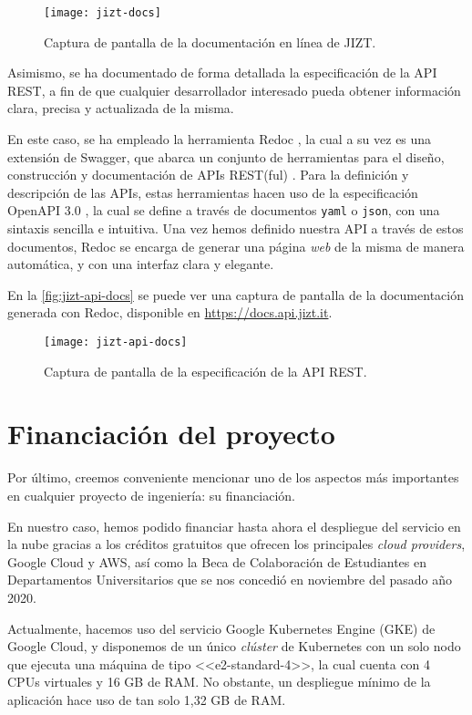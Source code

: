 \begin{figure}[h]
	\centering
	\texttt{[image: jizt-docs]}
	\caption{Captura de pantalla de la documentación en línea de JIZT.}
	\label{fig:jizt-docs}
\end{figure}

Asimismo, se ha documentado de forma detallada la especificación de la API REST, a fin de que cualquier desarrollador interesado pueda obtener información clara, precisa y actualizada de la misma.

En este caso, se ha empleado la herramienta Redoc \cite{redoc}, la cual a su vez es una extensión de Swagger, que abarca un conjunto de herramientas para el diseño, construcción y documentación de APIs REST(ful) \cite{swagger}. Para la definición y descripción de las APIs, estas herramientas hacen uso de la especificación OpenAPI 3.0 \cite{openapi}, la cual se define a través de documentos \texttt{yaml} o \texttt{json}, con una sintaxis sencilla e intuitiva. Una vez hemos definido nuestra API a través de estos documentos, Redoc se encarga de generar una página \emph{web} de la misma de manera automática, y con una interfaz clara y elegante.

En la \autoref{fig:jizt-api-docs} se puede ver una captura de pantalla de la documentación generada con Redoc, disponible en \href{https://docs.api.jizt.it}{https://docs.api.jizt.it}.

\newpage

\begin{figure}[h]
	\centering
	\texttt{[image: jizt-api-docs]}
	\caption{Captura de pantalla de la especificación de la API REST.}
	\label{fig:jizt-api-docs}
\end{figure}

\section{Financiación del proyecto}

Por último, creemos conveniente mencionar uno de los aspectos más importantes en cualquier proyecto de ingeniería: su financiación.

En nuestro caso, hemos podido financiar hasta ahora el despliegue del servicio en la nube gracias a los créditos gratuitos que ofrecen los principales \emph{cloud providers}, Google Cloud y AWS, así como la Beca de Colaboración de Estudiantes en Departamentos Universitarios que se nos concedió en noviembre del pasado año 2020.

Actualmente, hacemos uso del servicio Google Kubernetes Engine (GKE) de Google Cloud, y disponemos de un único \emph{clúster} de Kubernetes con un solo nodo que ejecuta una máquina de tipo <<e2-standard-4>>, la cual cuenta con 4 CPUs virtuales y 16 GB de RAM. No obstante, un despliegue mínimo de la aplicación hace uso de tan solo 1,32 GB de RAM.

